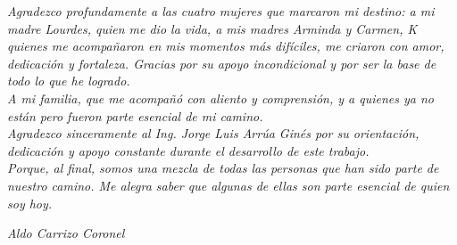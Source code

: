 \thispagestyle{empty}
\null\vfill

\large \textit{Agradezco profundamente a las cuatro mujeres que marcaron mi destino: a mi madre Lourdes, quien me dio la vida, a mis madres Arminda y Carmen, K quienes me acompañaron en mis momentos más difíciles, me criaron con amor, dedicación y fortaleza. Gracias por su apoyo incondicional y por ser la base de todo lo que he logrado.
\\ A mi familia, que me acompañó con aliento y comprensión, y a quienes ya no están pero fueron parte esencial de mi camino.
\\ Agradezco sinceramente al Ing. Jorge Luis Arrúa Ginés por su orientación, dedicación y apoyo constante durante el desarrollo de este trabajo.
\\ Porque, al final, somos una mezcla de todas las personas que han sido parte de nuestro camino. Me alegra saber que algunas de ellas son parte esencial de quien soy hoy.}
\begin{flushright}
\large \textit{Aldo Carrizo Coronel}
\end{flushright}